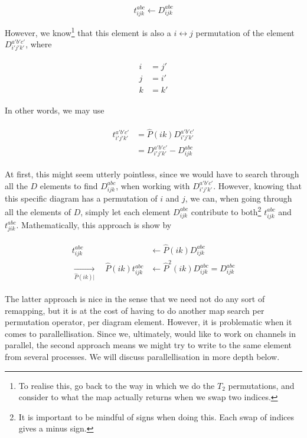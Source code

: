 	\begin{equation}
		t_{ijk}^{abc} \leftarrow D_{ijk}^{abc}
	\end{equation}
	
	However, we know\footnote{To realise this, go back to the way in which we do the $T_2$ permutations, and consider to what the map actually returns when we swap two indices.} that this element is also a $i\leftrightarrow j$ permutation of the element $D_{i'j'k'}^{a'b'c'}$, where
	
	\begin{align}
	\begin{split}
	i &= j' \\
	j &= i' \\
	k &= k'
	\end{split}
	\end{align}
	
	In other words, we may use
	
	\begin{align}
		\begin{split}
		t_{i'j'k'}^{a'b'c'} &= \hat{P}(ik)D_{i'j'k'}^{a'b'c'} \\
		&= D_{i'j'k'}^{a'b'c'} - D_{ijk}^{abc}
		\end{split}
	\end{align}
	
	At first, this might seem utterly pointless, since we would have to search through all the $D$ elements to find $D_{ijk}^{abc}$, when working with $D_{i'j'k'}^{a'b'c'}$. However, knowing that this specific diagram has a permutation of $i$ and $j$, we can, when going through all the elements of $D$, simply let each element $D_{ijk}^{abc}$ contribute to both\footnote{It is important to be mindful of signs when doing this. Each swap of indices gives a minus sign.} $t_{ijk}^{abc}$ and $t_{jik}^{abc}$. Mathematically, this approach is show by
	
	\begin{align}
		\begin{split}
			t_{ijk}^{abc} &\leftarrow \hat{P}(ik) D_{ijk}^{abc} \\
			\underset{\hat{P}(ik)\big|}{\longrightarrow}\quad \hat{P}(ik)t_{ijk}^{abc} &\leftarrow \hat{P}^2(ik)D_{ijk}^{abc} = D_{ijk}^{abc}
		\end{split}
	\end{align}
	
	The latter approach is nice in the sense that we need not do any sort of remapping, but it is at the cost of having to do another map search per permutation operator, per diagram element. However, it is problematic when it comes to parallellisation. Since we, ultimately, would like to work on channels in parallel, the second approach means we might try to write to the same element from several processes. We will discuss parallellisation in more depth below.
	
